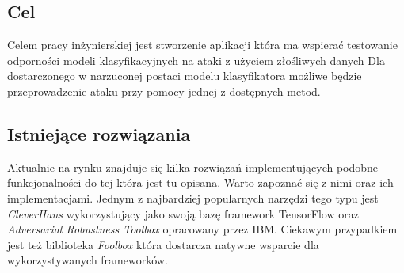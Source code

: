 \documentclass[
    left=2.5cm,         %
    right=2.5cm,        %
    top=2.5cm,          %
    bottom=3cm,         %
    bindingoffset=6mm,  %
    nohyphenation=false %
]{eiti/eiti-thesis}
\begin{document}
\subsection{Cel}
\label{sec:target}

Celem pracy inżynierskiej jest stworzenie aplikacji która ma wspierać testowanie
odporności modeli klasyfikacyjnych na ataki z użyciem złośliwych danych
Dla dostarczonego w narzuconej postaci modelu klasyfikatora możliwe będzie
przeprowadzenie ataku przy pomocy jednej z dostępnych metod.

\subsection{Istniejące rozwiązania}

Aktualnie na rynku znajduje się kilka rozwiązań implementujących podobne funkcjonalności
do tej która jest tu opisana. Warto zapoznać się z nimi oraz ich implementacjami.
Jednym z najbardziej popularnych narzędzi tego typu jest \textit{CleverHans}\cite{DBLP:journals/corr/GoodfellowPM16}
wykorzystujący jako swoją bazę framework TensorFlow oraz \textit{Adversarial Robustness Toolbox}\cite{DBLP:journals/corr/abs-1807-01069} opracowany przez IBM.
Ciekawym przypadkiem jest też biblioteka \textit{Foolbox}\cite{rauber2017foolbox} która dostarcza natywne wsparcie dla wykorzystywanych frameworków.

\end{document}
